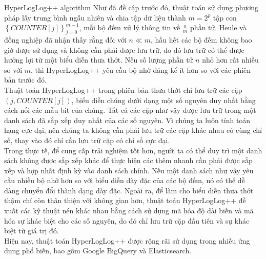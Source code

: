 \documentclass[10pt]{beamer}
\begin{document}
\begin{frame}{HyperLogLog++ algorithm}
  Như đã đề cập trước đó, thuật toán sử dụng phương pháp lấy trung bình ngẫu nhiên và chia tập dữ liệu thành $m = 2^p$ tập con $\left\{COUNTER[j]\right\}_{j=0}^{m-1}$, 
  mỗi bộ đếm xử lý thông tin về $\frac{n}{m}$ phần tử. Heule và đồng nghiệp đã nhận thấy rằng đối với $n \ll m$, hầu hết các bộ đếm không bao giờ được 
  sử dụng và không cần phải được lưu trữ, do đó lưu trữ có thể được hưởng lợi từ một biểu diễn thưa thớt. Nếu số lượng phần tử $n$ nhỏ hơn rất nhiều 
  so với $m$, thì HyperLogLog++ yêu cầu bộ nhớ đáng kể ít hơn so với các phiên bản trước đó.\\
  \indent Thuật toán HyperLogLog++ trong phiên bản thưa thớt chỉ lưu trữ các cặp $(j, COUNTER[j])$, biểu diễn chúng dưới dạng một số nguyên duy nhất 
  bằng cách nối các mẫu bit của chúng. Tất cả các cặp như vậy được lưu trữ trong một danh sách đã sắp xếp duy nhất của các số nguyên. 
  Vì chúng ta luôn tính toán hạng cực đại, nên chúng ta không cần phải lưu trữ các cặp khác nhau có cùng chỉ số, thay vào đó chỉ cần lưu trữ cặp 
  có chỉ số cực đại.\\
  
  Trong thực tế, để cung cấp trải nghiệm tốt hơn, người ta có thể duy trì một danh sách không được sắp xếp khác để thực hiện các thêm nhanh 
  cần phải được sắp xếp và hợp nhất định kỳ vào danh sách chính. Nếu một danh sách như vậy yêu cầu nhiều bộ nhớ hơn so với biểu diễn dày đặc 
  của các bộ đếm, nó có thể dễ dàng chuyển đổi thành dạng dày đặc. Ngoài ra, để làm cho biểu diễn thưa thớt thậm chí còn thân thiện với không gian hơn, 
  thuật toán HyperLogLog++ đề xuất các kỹ thuật nén khác nhau bằng cách sử dụng mã hóa độ dài biến và mã hóa sự khác biệt cho các số nguyên, 
  do đó chỉ lưu trữ cặp đầu tiên và sự khác biệt từ giá trị đó.\\
  
  \indent Hiện nay, thuật toán HyperLogLog++ được rộng rãi sử dụng trong nhiều ứng dụng phổ biến, bao gồm Google BigQuery và Elasticsearch.
\end{frame}
\end{document}
